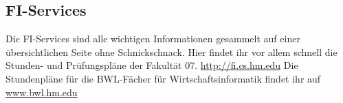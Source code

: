 \subsection{FI-Services}
Die FI-Services sind alle wichtigen Informationen gesammelt auf einer 
übersichtlichen Seite ohne Schnickschnack. Hier findet ihr vor allem 
schnell die Stunden- und Prüfungspläne der Fakultät 07. 
\url{http://fi.cs.hm.edu}
Die Stundenpläne für die BWL-Fächer für Wirtschaftsinformatik 
findet ihr auf \url{www.bwl.hm.edu} \arrow {}